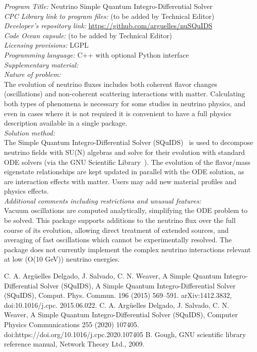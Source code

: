 \documentclass[3p,12pt]{elsarticle}
\begin{document}
\begin{small}
\noindent
{\em Program Title:} Neutrino Simple Quantum Integro-Differential Solver \\
{\em CPC Library link to program files:} (to be added by Technical Editor) \\
{\em Developer's repository link:} \url{https://github.com/arguelles/nuSQuIDS} \\
{\em Code Ocean capsule:} (to be added by Technical Editor)\\
{\em Licensing provisions:} LGPL  \\
{\em Programming language:} C++ with optional Python interface \\
{\em Supplementary material:}                                 \\
{\em Nature of problem:}\\
The evolution of neutrino fluxes includes both coherent flavor changes (oscillations) and non-coherent scattering interactions with matter. Calculating both types of phenomena is necessary for some studies in neutrino physics, and even in cases where it is not required it is convenient to have a full physics description available in a single package. \\
{\em Solution method:}\\
The Simple Quantum Integro-Differential Solver (SQuIDS)~\cite{summary_squids, summary_squids_update} is used to decompose neutrino fields with SU(N) algebras and solve for their evolution with standard ODE solvers (via the GNU Scientific Library~\cite{summary_gsl}). The evolution of the flavor/mass eigenstate relationships are kept updated in parallel with the ODE solution, as are interaction effects with matter. Users may add new material profiles and physics effects. \\
{\em Additional comments including restrictions and unusual features:}\\
Vacuum oscillations are computed analytically, simplifying the ODE problem to be solved. This package supports additions to the neutrino flux over the full course of its evolution, allowing direct treatment of extended sources, and averaging of fast oscillations which cannot be experimentally resolved. The package does not currently implement the complex neutrino interactions relevant at low (O(10 GeV)) neutrino energies. 
   \\

\begin{thebibliography}{0}
C. A. Arg\"uelles Delgado, J. Salvado, C. N. Weaver, A Simple Quantum Integro-Differential Solver (SQuIDS), A Simple Quantum Integro-Differential Solver (SQuIDS), Comput. Phys. Commun. 196 (2015) 569–591. arXiv:1412.3832, doi:10.1016/j.cpc. 2015.06.022.
C. A. Arg\"uelles Delgado, J. Salvado, C. N. Weaver, A Simple Quantum Integro-Differential Solver (SQuIDS), Computer Physics Communications 255 (2020) 107405. doi:https://doi.org/10.1016/j.cpc.2020.107405
B. Gough, GNU scientific library reference manual, Network Theory Ltd., 2009.
\end{thebibliography}
\end{small}
\fi %
\end{document}
